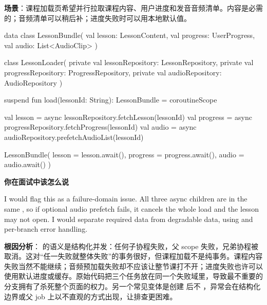 
\textbf{场景}：课程加载页希望并行拉取课程内容、用户进度和发音音频清单。内容是必需的；音频清单可以稍后补；进度失败时可以用本地默认值。

\begin{ktbug}
data class LessonBundle(
    val lesson: LessonContent,
    val progress: UserProgress,
    val audio: List<AudioClip>
)

class LessonLoader(
    private val lessonRepository: LessonRepository,
    private val progressRepository: ProgressRepository,
    private val audioRepository: AudioRepository
) {
    suspend fun load(lessonId: String): LessonBundle = coroutineScope {
        val lesson = async { lessonRepository.fetchLesson(lessonId) }
        val progress = async { progressRepository.fetchProgress(lessonId) }
        val audio = async { audioRepository.prefetchAudioList(lessonId) }

        LessonBundle(
            lesson = lesson.await(),
            progress = progress.await(),
            audio = audio.await()
        )
    }
}
\end{ktbug}

\textbf{你在面试中该怎么说}
\begin{sayit}[失败域]
I would flag this as a failure-domain issue. All three async children are in the same , so if optional audio prefetch fails, it cancels the whole load and the lesson may not open. I would separate required data from degradable data, using  and per-branch error handling.
\end{sayit}

\textbf{根因分析}： 的语义是结构化并发：任何子协程失败，父 scope 失败，兄弟协程被取消。这对“任一失败就整体失败”的事务很好，但课程加载不是纯事务。课程内容失败当然不能继续；音频预加载失败却不应该让整节课打不开；进度失败也许可以使用默认进度或缓存。原始代码把三个任务放在同一个失败域里，导致最不重要的分支拥有了杀死整个页面的权力。另一个常见变体是创建  后不 ，异常会在结构化边界或父 job 上以不直观的方式出现，让排查更困难。 \srcinferred


